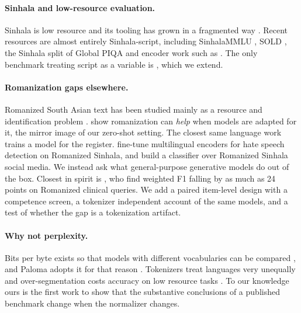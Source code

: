 \documentclass{article}
\begin{document}
\paragraph{Sinhala and low-resource evaluation.} Sinhala is low resource and its
tooling has grown in a fragmented way \citep{desilva-2019-survey,
ranathunga-de-silva-2022-languages, joshi-etal-2020-state}. Recent resources are almost
entirely Sinhala-script, including SinhalaMMLU \citep{pramodya-etal-2025-sinhalammlu}, SOLD
\citep{ranasinghe-etal-2025-sold}, the Sinhala split of Global PIQA
\citep{desilva-ranathunga-2026-sinhalapiqa, chang-etal-2025-globalpiqa} and encoder work
such as \citet{dhananjaya-etal-2022-bertifying}. The only benchmark treating script as a
variable is \citet{rajapakse-weerasinghe-2026-script}, which we extend.

\paragraph{Romanization gaps elsewhere.} Romanized South Asian text has been studied
mainly as a resource and identification problem \citep{roark-etal-2020-dakshina,
benton-etal-2025-improving}. \citet{j-etal-2024-romansetu} show romanization can
\emph{help} when models are adapted for it, the mirror image of our zero-shot setting.
The closest same language work trains a model for the register.
\citet{chamikara-sumanathilaka-2026} fine-tune multilingual encoders for hate speech
detection on Romanized Sinhala, and \citet{hewapathirana-sumanathilaka-2024-emoscan}
build a classifier over Romanized Sinhala social media. We instead ask what
general-purpose generative models do out of the box. Closest in spirit is
\citet{khullar-etal-2025-scriptgap}, who find weighted F1 falling by as much as 24 points
on Romanized clinical queries. We add a paired item-level design with a competence
screen, a tokenizer independent account of the same models, and a test of whether the gap
is a tokenization artifact.

\paragraph{Why not perplexity.} Bits per byte exists so that models with different
vocabularies can be compared \citep{gao-etal-2020-pile}, and Paloma adopts it for that
reason \citep{magnusson-etal-2024-paloma}. Tokenizers treat languages very unequally
\citep{petrov-etal-2023-tokenizers, ahia-etal-2023-languages} and over-segmentation costs
accuracy on low resource tasks \citep{nag-etal-2024-fragmented}. To our knowledge ours is
the first work to show that the substantive conclusions of a published benchmark change
when the normalizer changes.
\end{document}
